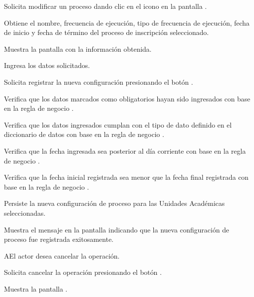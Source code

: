 \begin{UCtrayectoria}

	\UCpaso [\UCactor] Solicita modificar un proceso dando clic en el icono \IUEditar en la pantalla .
	
	\UCpaso Obtiene el nombre, frecuencia de ejecución, tipo de frecuencia de ejecución, fecha de inicio y fecha de término del proceso de inscripción seleccionado.

	\UCpaso Muestra la pantalla  con la información obtenida.

	\UCpaso [\UCactor] \label{IN-DAE-CU3.2:Ingresa} Ingresa los datos solicitados.

	\UCpaso  [\UCactor] \label{IN-DAE-CU3.2:Aceptar} Solicita registrar la nueva configuración presionando el botón .  

	\UCpaso Verifica que los datos marcados como obligatorios hayan sido ingresados con base en la regla de negocio . 

	\UCpaso Verifica que los datos ingresados cumplan con el tipo de dato definido en el diccionario de datos con base en la regla de negocio .  

	\UCpaso Verifica que la fecha ingresada sea posterior al día corriente con base en la regla de negocio .  

	\UCpaso Verifica que la fecha inicial registrada sea menor que la fecha final registrada con base en la regla de negocio . 

	\UCpaso Persiste la nueva configuración de proceso para las Unidades Académicas seleccionadas. 

	\UCpaso Muestra el mensaje  en la pantalla  indicando que la nueva configuración de proceso fue registrada exitosamente.
\end{UCtrayectoria}

\begin{UCtrayectoriaA}{A}{El actor desea cancelar la operación.}

	\UCpaso [\UCactor] Solicita cancelar la operación presionando el botón .

	\UCpaso Muestra la pantalla .

\end{UCtrayectoriaA}




